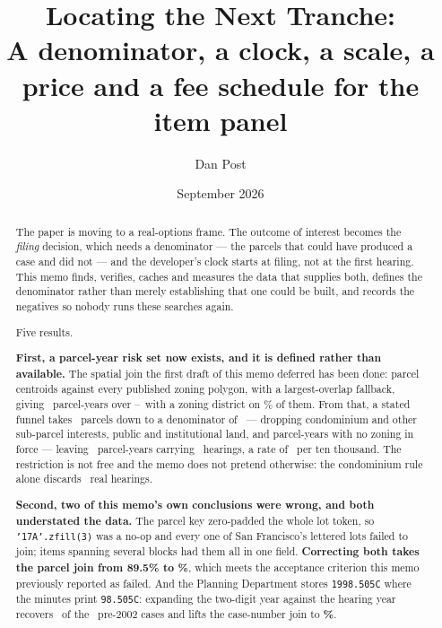 \documentclass[11pt]{article}
\title{Locating the Next Tranche:\\
\large A denominator, a clock, a scale, a price and a fee schedule for the
item panel}
\author{Dan Post}
\date{September 2026}
\begin{document}
\maketitle

\begin{abstract}
\noindent
The paper is moving to a real-options frame. The outcome of interest becomes the \emph{filing}
decision, which needs a denominator --- the parcels that could have produced a case and did
not --- and the developer's clock starts at filing, not at the first hearing. This memo finds,
verifies, caches and measures the data that supplies both, defines the denominator rather than
merely establishing that one could be built, and records the negatives so nobody runs these
searches again.

\medskip\noindent
Five results.

\medskip\noindent
\textbf{First, a parcel-year risk set now exists, and it is defined rather than available.}
The spatial join the first draft of this memo deferred has been done: parcel centroids against
every published zoning polygon, with a largest-overlap fallback, giving \acqPanelRows\
parcel-years over \acqPanelFirst--\acqPanelLast\ with a zoning district on \acqPanelZoned\% of
them. From that, a stated funnel takes \acqRiskStart\ parcels down to a denominator of
\acqRiskParcels\ --- dropping condominium and other sub-parcel interests, public and
institutional land, and parcel-years with no zoning in force --- leaving \acqRiskParcelYears\
parcel-years carrying \acqRiskEvents\ hearings, a rate of \acqRiskRate\ per ten thousand. The
restriction is not free and the memo does not pretend otherwise: the condominium rule alone
discards \acqRiskCondoLost\ real hearings.

\medskip\noindent
\textbf{Second, two of this memo's own conclusions were wrong, and both understated the
data.} The parcel key zero-padded the whole lot token, so \texttt{'17A'.zfill(3)} was a no-op
and every one of San Francisco's lettered lots failed to join; items spanning several blocks
had them all in one field. \textbf{Correcting both takes the parcel join from 89.5\% to
\acqParcelJoin\%}, which meets the acceptance criterion this memo previously reported as
failed. And the Planning Department stores \texttt{1998.505C} where the minutes print
\texttt{98.505C}: expanding the two-digit year against the hearing year recovers
\acqOldFormatMatched\ of the \acqOldFormatCases\ pre-2002 cases and lifts the case-number join
to \textbf{\acqCaseAny\%}.


\end{abstract}
\end{document}
